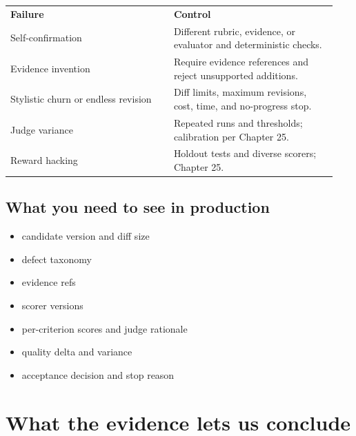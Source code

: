 \BookTableStart
\small
\begin{tabular}{@{}Y{0.4700\linewidth}Y{0.4700\linewidth}@{}}
\color{white}\bfseries \textbf{Failure} & \color{white}\bfseries \textbf{Control} \\
Self-confirmation & Different rubric, evidence, or evaluator and deterministic checks. \\
Evidence invention & Require evidence references and reject unsupported additions. \\
Stylistic churn or endless revision & Diff limits, maximum revisions, cost, time, and no-progress stop. \\
Judge variance & Repeated runs and thresholds; calibration per Chapter 25. \\
Reward hacking & Holdout tests and diverse scorers; Chapter 25. \\
\end{tabular}
\BookTableEnd

\subsection{What you need to see in production}

\begin{itemize}

\item candidate version and diff size

\item defect taxonomy

\item evidence refs

\item scorer versions

\item per-criterion scores and judge rationale

\item quality delta and variance

\item acceptance decision and stop reason

\end{itemize}

\section{What the evidence lets us conclude}

